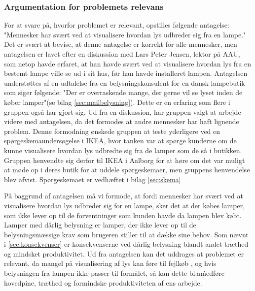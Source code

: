 \subsubsection{Argumentation for problemets relevans}
\label{sec:hvorfor_relavant}
For at svare på, hvorfor problemet er relevant, opstilles følgende antagelse: "Mennesker har svært ved at visualisere hvordan lys udbreder sig fra en lampe." Det er svært at bevise, at denne antagelse er korrekt for alle mennesker, men antagelsen er lavet efter en diskussion med Lars Peter Jensen, lektor på AAU, som netop havde erfaret, at han havde svært ved at visualisere hvordan lys fra en bestemt lampe ville se ud i sit hus, før han havde installeret lampen. Antagelsen understøttes af en udtalelse fra en belysningskonsulent for en dansk lampebutik som siger følgende: "Der er overraskende mange, der gerne vil se lyset inden de køber lamper"(se bilag \ref{sec:mailbelysning}). Dette er en erfaring som flere i gruppen også har gjort sig. Ud fra en diskussion, har gruppen valgt at arbejde videre med antagelsen, da det formodes at andre mennesker har haft lignende problem. Denne formodning ønskede gruppen at teste yderligere ved en spørgeskemaundersøgelse i IKEA, hvor tanken var at spørge kunderne om de kunne visualisere hvordan lys udbredte sig fra de lamper som de så i butikken. Gruppen henvendte sig derfor til IKEA i Aalborg for at høre om det var muligt at møde op i deres butik for at uddele spørgeskemaer, men gruppens henvendelse blev afvist. Spørgeskemaet er vedhæftet i bilag \ref{sec:skema}

På baggrund af antagelsen må vi formode, at fordi mennesker har svært ved at visualisere hvordan lys udbreder sig for en lampe, sker det at der købes lamper, som ikke lever op til de forventninger som kunden havde da lampen blev købt. Lamper med dårlig belysning er lamper, der ikke lever op til de belysningsmæssige krav som brugeren stiller til at dække sine behov. Som nævnt i \ref{sec:konsekvenser} er konsekvenserne ved dårlig belysning blandt andet træthed og mindsket produktivitet.
Ud fra antagelsen kan det uddrages at problemet er relevant, da mangel på visualisering af lys kan føre til fejlkøb , og hvis belysningen fra lampen ikke passer til formålet, så kan dette bl.a\. medføre hovedpine, træthed og formindske produktiviteten af ens arbejde.
